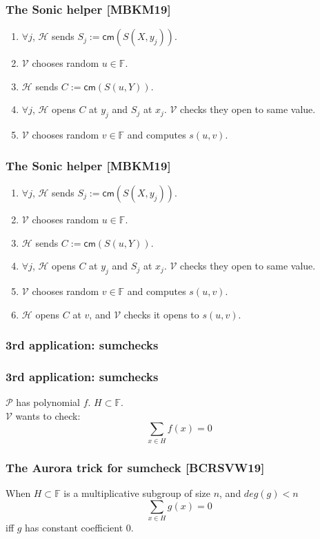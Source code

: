 \documentclass[shadesubsections,trans,14pt,mathserif]{beamer}
\newcommand{\F}{\ensuremath{\mathbb F}}
\newcommand{\cm}{\ensuremath{\mathsf{cm}}}
\newcommand{\defeq}{\ensuremath{:=}}
\newcommand{\helper}{\ensuremath{\mathcal{H}}}
\newcommand{\ver}{\ensuremath{\mathcal{V}}}
\newcommand{\prv}{\ensuremath{\mathcal{P}}}
\begin{document}
 \begin{frame}
  \frametitle{The Sonic helper \small{[MBKM19]}}
 \begin{enumerate}
  \item $\forall j$, $\helper$ sends $S_j \defeq \cm(S(X,y_j))$.
\item $\ver$ chooses random $u\in \F$.
\item $\helper$ sends $C\defeq \cm(S(u,Y))$.
\item $\forall j$, $\helper$ opens $C$ at $y_j$ and $S_j$ at $x_j$. $\ver$ checks they open to same value.
\item $\ver$ chooses random $v\in \F$ and computes $s(u,v)$.
\end{enumerate}
 \vspace{0.4in}
 \end{frame}

 
 
 \begin{frame}
\frametitle{The Sonic helper \small{[MBKM19]}}
 \begin{enumerate}
  \item $\forall j$, $\helper$ sends $S_j \defeq \cm(S(X,y_j))$.
\item $\ver$ chooses random $u\in \F$.
\item $\helper$ sends $C\defeq \cm(S(u,Y))$.
\item $\forall j$, $\helper$ opens $C$ at $y_j$ and $S_j$ at $x_j$. $\ver$ checks they open to same value.
\item $\ver$ chooses random $v\in \F$ and computes $s(u,v)$.
\item $\helper$ opens $C$ at $v$, and $\ver$ checks it opens to $s(u,v)$.
\end{enumerate}
 \vspace{0.4in}
 \end{frame}

  \begin{frame}
\frametitle{3rd application: sumchecks }
 \end{frame}
 
  \begin{frame}
\frametitle{3rd application: sumchecks}
$\prv$ has polynomial $f$. $H\subset \F$. \\
 \vspace{0.4in}
$\ver$ wants to check:
\[\sum_{x\in H} f(x) =0\]

\end{frame}


  \begin{frame}
\frametitle{The Aurora trick for sumcheck \small{[BCRSVW19]}}
\begin{lemma}
 When $H\subset \F$ is a multiplicative subgroup of size $n$, and $deg(g)<n$
\[\sum_{x\in H} g(x) =0\]
iff $g$ has constant coefficient $0$.
\end{lemma}
 \vspace{0.4in}

\end{frame}
\end{document}
